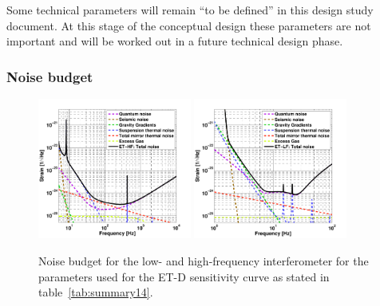 Some technical parameters will remain ``to be defined'' in this design study 
document. At this stage of the conceptual design these parameters are not 
important and will be worked out in a future technical design phase.

\subsubsection{\label{Noisebudget}Noise budget}

\begin{figure}
  \begin{center}
\vskip -0.3cm
    \includegraphics[width=0.45\textwidth]{Intro/Intro_Figures/ETD_HF3.pdf}
%  
\vskip 0.4cm
    \includegraphics[width=0.45\textwidth]{Intro/Intro_Figures/ETD_LF3.pdf}
    \caption{Noise budget for the low- and high-frequency interferometer for the 
    parameters used for the ET-D sensitivity curve as stated in table~\ref{tab:summary14}.}
    \label{fig:noise_budget}
    \vspace{-0.7cm}
  \end{center}
\end{figure}

